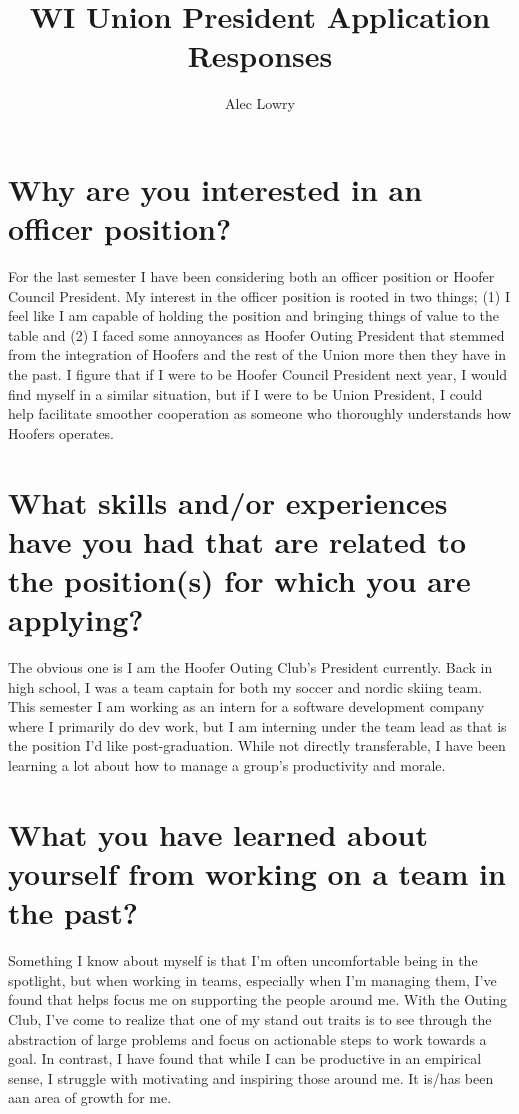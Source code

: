 \documentclass[12pt]{article}
\title{WI Union President Application Responses}
\author{Alec Lowry}
\begin{document}
\maketitle

\section{Why are you interested in an officer position?}

    For the last semester I have been considering both an officer position or Hoofer Council President. My interest in the officer position is rooted in two things; (1) I feel like I am capable of holding the position and bringing things of value to the table and (2) I faced some annoyances as Hoofer Outing President that stemmed from the integration of Hoofers and the rest of the Union more then they have in the past.  I figure that if I were to be Hoofer Council President next year, I would find myself in a similar situation, but if I were to be Union President, I could help facilitate smoother cooperation as someone who thoroughly understands how Hoofers operates.

\section{What skills and/or experiences have you had that are related to the position(s) for which you are applying?}

    The obvious one is I am the Hoofer Outing Club's President currently. Back in high school, I was a team captain for both my soccer and nordic skiing team. This semester I am working as an intern for a software development company where I primarily do dev work, but I am interning under the team lead as that is the position I'd like post-graduation.  While not directly transferable, I have been learning a lot about how to manage a group's productivity and morale.

\section{What you have learned about yourself from working on a team in the past?}

    Something I know about myself is that I'm often uncomfortable being in the spotlight, but when working in teams, especially when I'm managing them, I've found that helps focus me on supporting the people around me. With the Outing Club, I've come to realize that one of my stand out traits is to see through the abstraction of large problems and focus on actionable steps to work towards a goal. In contrast, I have found that while I can be productive in an empirical sense, I struggle with motivating and inspiring those around me. It is/has been aan area of growth for me.
\end{document}
